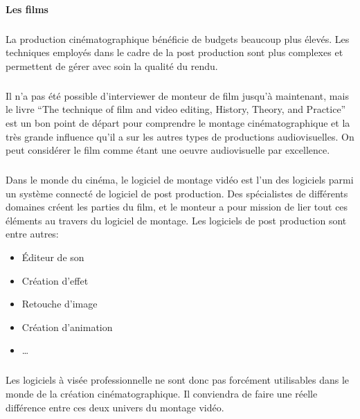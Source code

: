 \paragraph {Les films}

\subparagraph{}

La production cinématographique bénéficie de budgets beaucoup plus
élevés. Les techniques employés dans le cadre de la post production
sont plus complexes et permettent de gérer avec soin la qualité
du rendu.

\subparagraph{}

Il n'a pas été possible d'interviewer de monteur de film jusqu'à
maintenant, mais le livre ``The technique of film and video editing,
History, Theory, and Practice'' \cite{TheTechniqueOfFilmAndVideoEditing}
est un bon point de départ pour comprendre le montage cinématographique
et la très grande influence qu'il a sur les autres types de productions
audiovisuelles. On peut considérer le film comme étant une oeuvre
audiovisuelle par excellence. %

\subparagraph{}

Dans le monde du cinéma, le logiciel de montage vidéo est l'un des
logiciels parmi un système connecté de logiciel de post production. Des
spécialistes de différents domaines créent les parties du film,
et le monteur a pour mission de lier tout ces éléments au travers du
logiciel de montage. Les logiciels de post production sont entre autres:

\begin{itemize} \setlength{\itemsep}{2mm}

  \item{Éditeur de son}

  \item{Création d'effet}

  \item{Retouche d'image}

  \item{Création d'animation}

  \item{\ldots}

\end{itemize}

\subparagraph{}

Les logiciels à visée professionnelle ne sont donc pas forcément
utilisables dans le monde de la création cinématographique. Il
conviendra de faire une réelle différence entre ces deux univers du
montage vidéo.

\subparagraph{}

